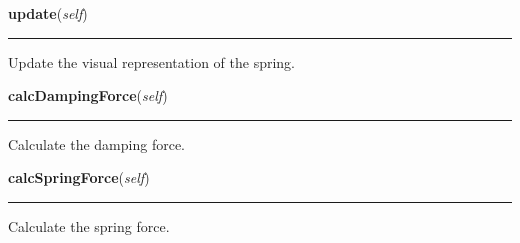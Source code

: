     \begin{boxedminipage}{\textwidth}

    \raggedright \textbf{update}(\textit{self})

    \vspace{-1.5ex}

    \rule{\textwidth}{0.5\fboxrule}
    Update the visual representation of the spring.

    \vspace{1ex}

    \end{boxedminipage}

    \label{Epigrass:dgraph:_Edge:calcDampingForce}

    \vspace{0.5ex}

    \begin{boxedminipage}{\textwidth}

    \raggedright \textbf{calcDampingForce}(\textit{self})

    \vspace{-1.5ex}

    \rule{\textwidth}{0.5\fboxrule}
    Calculate the damping force.

    \vspace{1ex}

    \end{boxedminipage}

    \label{Epigrass:dgraph:_Edge:calcSpringForce}

    \vspace{0.5ex}

    \begin{boxedminipage}{\textwidth}

    \raggedright \textbf{calcSpringForce}(\textit{self})

    \vspace{-1.5ex}

    \rule{\textwidth}{0.5\fboxrule}
    Calculate the spring force.

    \vspace{1ex}

    \end{boxedminipage}

